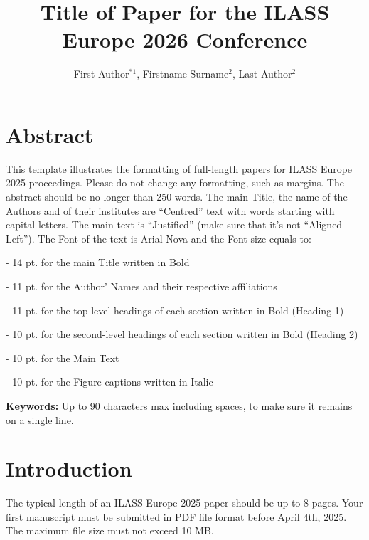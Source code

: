 \documentclass[fleqn]{ILASSEurope_2026_Paper_Format}
\begin{document}
\title{Title of Paper for the ILASS Europe 2026 Conference}

\doi{}
\vspace{1mm}
\author{First Author$^{*\text{1}}$, Firstname Surname$^{\text{2}}$, Last Author$^{\text{2}}$}
\vskip 5mm
\address{$^{\text{1}}$ Name of the Research Group, Department/Institute, University/Company, Country\\
$^{\text{2}}$ Division of Combustion Physics, Department of Physics, Lund University, Sweden\\
\vskip 2pt
{}}
\vspace{5mm}
\section*{Abstract}
This template illustrates the formatting of full-length papers for ILASS Europe 2025 proceedings. Please do not change any formatting, such as margins. The abstract should be no longer than 250 words. The main Title, the name of the Authors and of their institutes are “Centred” text with words starting with capital letters. The main text is “Justified” (make sure that it’s not “Aligned Left”).  The Font of the text is Arial Nova and the Font size equals to: 

- 14 pt. for the main Title written in Bold

- 11 pt. for the Author' Names and their respective affiliations

- 11 pt. for the top-level headings of each section written in Bold (Heading 1)

- 10 pt. for the second-level headings of each section written in Bold (Heading 2)

- 10 pt. for the Main Text

- 10 pt. for the Figure captions written in Italic

\vspace{5mm}
\textbf{Keywords:} Up to 90 characters max including spaces, to make sure it remains on a single line.
\vspace{5mm}

\section*{Introduction}
The typical length of an ILASS Europe 2025 paper should be up to 8 pages. Your first manuscript must be submitted in PDF file format before April 4th, 2025. The maximum file size must not exceed 10 MB.
\vspace{5mm}
\end{document}
